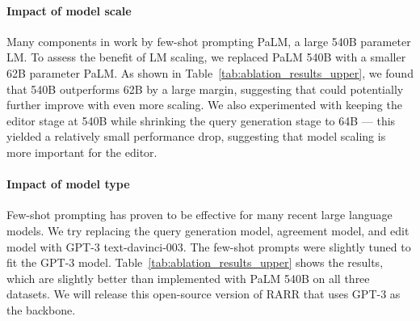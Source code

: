\documentclass[11pt]{article}
\begin{document}
\paragraph{Impact of model scale}
Many components in \approach{} work by few-shot prompting PaLM, a large 540B  parameter LM. To assess the benefit of LM scaling, we replaced PaLM 540B with a smaller 62B parameter PaLM. As shown in Table~\ref{tab:ablation_results_upper}, we found that 540B outperforms 62B by a large margin, suggesting that \approach{} could potentially further improve with even more scaling. We also experimented with keeping the editor stage at 540B while shrinking the query generation stage to 64B --- this yielded a relatively small performance drop, suggesting that model scaling is more important for the editor.

\paragraph{Impact of model type}
Few-shot prompting has proven to be effective for many recent large language models. We try replacing the query generation model, agreement model, and edit model with GPT-3 text-davinci-003. The few-shot prompts were slightly tuned to fit the GPT-3 model.
Table~\ref{tab:ablation_results_upper} shows the results, which are slightly better than \approach{} implemented with PaLM 540B on all three datasets.
We will release this open-source version of RARR that uses GPT-3 as the backbone.
\end{document}
